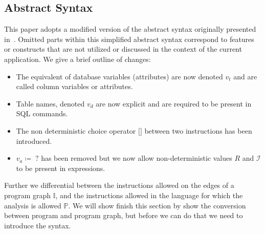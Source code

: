 \subsection{Abstract Syntax} \label{subsec:abstract-syntax}

This paper adopts a modified version of the abstract syntax originally presented in~\cite{cortesi_abstract_2013}.
Omitted parts within this simplified abstract syntax correspond to features or constructs that are not utilized or discussed in the context of the current application.
We give a brief outline of changes:
\begin{itemize}
    \item The equivalent of database variables (attributes) are now denoted $v_t$ and are called column variables or attributes.
    \item Table names, denoted $v_d$ are now explicit and are required to be present in SQL commands.
    \item The non deterministic choice operator $\texttt{[]}$ between two instructions has been introduced.
    \item $v_a \coloneq \; ?$ has been removed but we now allow non-deterministic values $R$ and $\mathscr{I}$ to be present in expressions.
\end{itemize}

Further we differential between the instructions allowed on the edges of a program graph $\mathbb{I}$, and the instructions allowed in the language for which the analysis is allowed $\mathbb{P}$.
We will show finish this section by show the conversion between program and program graph, but before we can do that we need to introduce the syntax.

